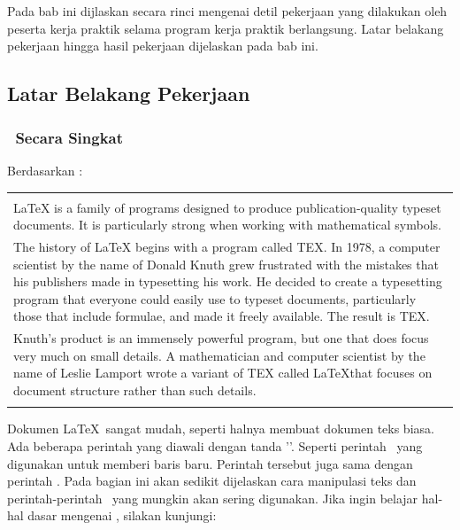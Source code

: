 \chapter{\babDua}
\label{bab:2}
Pada bab ini dijlaskan secara rinci mengenai detil pekerjaan yang dilakukan oleh peserta kerja praktik selama program kerja praktik berlangsung. Latar belakang pekerjaan hingga hasil pekerjaan dijelaskan pada bab ini.

\section{Latar Belakang Pekerjaan}
\label{sec:latar-belakang}

\subsection{\latex~Secara Singkat}
\label{sec:latexBrief}
Berdasarkan \cite{latex:intro}: \\
\begin{tabular}{| p{13cm} |}
	\hline
	\\
	LaTeX is a family of programs designed to produce publication-quality typeset documents.
	It is particularly strong when working with mathematical symbols. \\
	The history of LaTeX begins with a program called TEX.
	In 1978, a computer scientist by the name of Donald Knuth grew frustrated with the mistakes that his publishers made in typesetting his work.
	He decided to create a typesetting program that everyone could easily use to typeset documents, particularly those that include formulae, and made it freely available.
	The result is TEX. \\
	Knuth's product is an immensely powerful program, but one that does focus very much on small details.
	A mathematician and computer scientist by the name of Leslie Lamport wrote a variant of TEX called \LaTeX that focuses on document structure rather than such details. \\
	\\
	\hline
\end{tabular}

\vspace*{0.8cm}

Dokumen \LaTeX~sangat mudah, seperti halnya membuat dokumen teks biasa.
Ada beberapa perintah yang diawali dengan tanda '\bslash'.
Seperti perintah \code{\bslash\bslash}~yang digunakan untuk memberi baris baru.
Perintah tersebut juga sama dengan perintah .
Pada bagian ini akan sedikit dijelaskan cara manipulasi teks dan perintah-perintah \latex~yang mungkin akan sering digunakan.
Jika ingin belajar hal-hal dasar mengenai \latex, silakan kunjungi:

